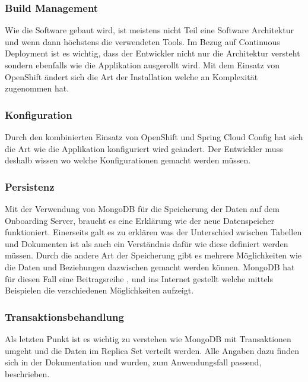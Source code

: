 \subsubsection{Build Management}

Wie die Software gebaut wird, ist meistens nicht Teil eine Software Architektur und wenn dann höchstens die verwendeten Tools. Im Bezug auf Continuous Deployment ist es wichtig, dass der Entwickler nicht nur die Architektur versteht sondern ebenfalls wie die Applikation ausgerollt wird. Mit dem Einsatz von OpenShift ändert sich die Art der Installation welche an Komplexität zugenommen hat.

\subsubsection{Konfiguration}

Durch den kombinierten Einsatz von OpenShift und Spring Cloud Config hat sich die Art wie die Applikation konfiguriert wird geändert. Der Entwickler muss deshalb wissen wo welche Konfigurationen gemacht werden müssen.

\subsubsection{Persistenz}

Mit der Verwendung von MongoDB für die Speicherung der Daten auf dem Onboarding Server, braucht es eine Erklärung wie der neue Datenspeicher funktioniert. Einerseits galt es zu erklären was der Unterschied zwischen Tabellen und Dokumenten ist als auch ein Verständnis dafür wie diese definiert werden müssen. Durch die andere Art der Speicherung gibt es mehrere Möglichkeiten wie die Daten und Beziehungen dazwischen gemacht werden können. MongoDB hat für diesen Fall eine Beitragsreihe \cite{mongoschema1}, \cite{mongoschema2} und \cite{mongoschema3} ins Internet gestellt welche mittels Beispielen die verschiedenen Möglichkeiten aufzeigt.

\subsubsection{Transaktionsbehandlung}

Als letzten Punkt ist es wichtig zu verstehen wie MongoDB mit Transaktionen umgeht und die Daten im Replica Set verteilt werden. Alle Angaben dazu finden sich in der Dokumentation \cite{wirteconcern} und wurden, zum Anwendungsfall passend, beschrieben.


